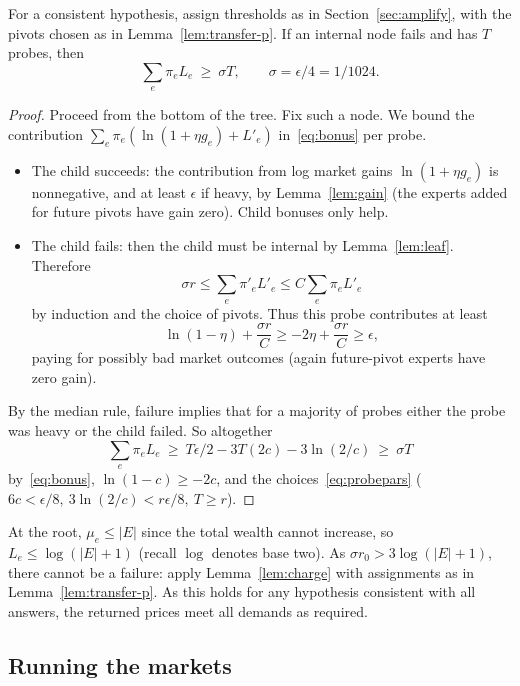 \begin{lemma}\label{lem:charge}
For a consistent hypothesis, assign thresholds as in
Section~\ref{sec:amplify}, with the pivots chosen as in
Lemma~\ref{lem:transfer-p}.
If an internal node fails and has \(T\) probes, then
\begin{equation}\label{eq:charge}
           \sum_e \pi_e L_e\ \ge\ \sigma T,\qquad
           \sigma=\epsilon/4=1/1024 .
\end{equation}
\end{lemma}
\begin{proof}
Proceed from the bottom of the tree.
Fix such a node.
We bound the contribution
\(
   \sum_e\pi_e (\ln(1+\eta g_e)+L'_e)
\)
in~\eqref{eq:bonus} per probe.
\begin{itemize}
 \item The child succeeds:
 the contribution from log market gains
 \(\ln(1+\eta g_e)\)
 is nonnegative, and at least \(\epsilon\)
 if heavy, by Lemma~\ref{lem:gain}
 (the experts added for future pivots have gain zero).
 Child bonuses only help.
 \item The child fails:
 then the child must be internal by Lemma~\ref{lem:leaf}.
 Therefore
 \[
    \sigma r\le
         \sum_e \pi'_e L'_e
        \le C\sum_e \pi_e L'_e
 \]
 by induction and the choice of pivots. Thus this probe contributes at least
 \[
       \ln(1-\eta)+\frac{\sigma r}{C}
       \ge -2\eta+\frac{\sigma r}{C} \ge\epsilon ,
 \]
 paying for possibly bad market outcomes
 (again future-pivot experts have zero gain).
\end{itemize}
By the median rule, failure implies that for a majority
of probes either the probe was heavy or the child failed.
So altogether
\[
   \sum_e \pi_e L_e\ \ge\
      T\epsilon/2
          -3T(2c)-3\ln(2/c)\ \ge\ \sigma T
\]
by~\eqref{eq:bonus}, \(\ln(1-c)\ge-2c\),
and the choices~\eqref{eq:probepars}
(\(6c<\epsilon/8,\ 3\ln(2/c)<r\epsilon/8,\ T\ge r\)).
\end{proof}

At the root, \(\mu_e\le|E|\)
since the total wealth cannot increase,
so \(L_e\le\log(|E|+1)\)
(recall \(\log\) denotes base two).
As \(\sigma r_0>3\log(|E|+1)\),
there cannot be a failure: apply Lemma~\ref{lem:charge}
with assignments as in Lemma~\ref{lem:transfer-p}.
As this holds for any hypothesis consistent with all answers,
the returned prices meet all demands as required.

\subsection{Running the markets}\label{sec:implement-pr}

